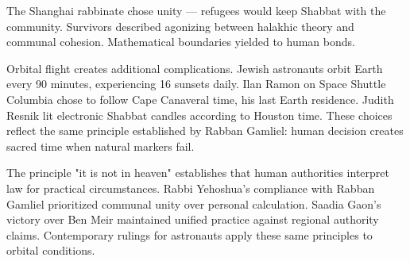 The Shanghai rabbinate chose unity — refugees would keep Shabbat with the community. Survivors described agonizing between halakhic theory and communal cohesion. Mathematical boundaries yielded to human bonds.

Orbital flight creates additional complications. Jewish astronauts orbit Earth every 90 minutes, experiencing 16 sunsets daily. Ilan Ramon on Space Shuttle Columbia chose to follow Cape Canaveral time, his last Earth residence. Judith Resnik lit electronic Shabbat candles according to Houston time. These choices reflect the same principle established by Rabban Gamliel: human decision creates sacred time when natural markers fail.

The principle "it is not in heaven" establishes that human authorities interpret law for practical circumstances. Rabbi Yehoshua's compliance with Rabban Gamliel prioritized communal unity over personal calculation. Saadia Gaon's victory over Ben Meir maintained unified practice against regional authority claims. Contemporary rulings for astronauts apply these same principles to orbital conditions.
